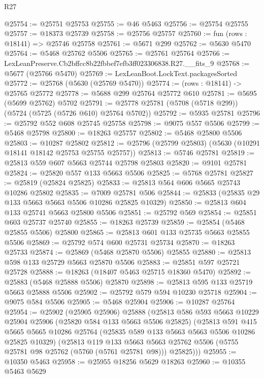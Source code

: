\begin{lexlean}{R27}
\begin{coremodule}
@25754 := @25751 @25753
@25755 := @46 @5463
@25756 := @25754 @25755
@25757 := @18373 @25739
@25758 := @25756 @25757
@25760 := fun (rows : @18141) => @25746 @25758
@25761 := @5671 @299
@25762 := @5630 @5470
@25764 := @5468 @25762 @5506
@25765 := @25761 @25764
@25766 := LexLeanPreserve.Cb2bffcc8b22fbbef7efb3ff023306838.R27.__fits_9
@25768 := @5677 (@25766 @5470)
@25769 := LexLeanBoot.LockText.packagesSorted
@25772 := @25768 (@5630 (@25769 @5470))
@25774 := (rows : @18141) -> @25765 @25772
@25778 := @5688 @299 @25764 @25772 @610
@25781 := @5695 (@5699 @25762) @5702
@25791 := @25778 @25781 (@5708 (@5718 @299)) (@5724 (@5725 (@5726 @610) @25764 @5702))
@25792 := @5935 @25781
@25796 := @25792 @552 @608 @25745 @25758
@25798 := @9075 @557 @5506
@25799 := @5468 @25798
@25800 := @18263 @25757
@25802 := @5468 @25800 @5506
@25803 := @10287 @25802
@25812 := @25796 (@25799 @25803) (@5630 (@10291 @18141 @18142 @25753 @25755 @25757))
@25813 := @5746 @25781
@25819 := @25813 @559 @607 @5663 @25744 @25798 @25803
@25820 := @9101 @25781
@25824 := @25820 @557 @133 @5663 @5506
@25825 := @5768 @25781
@25827 := @25819 (@25824 @25825)
@25833 := @25813 @564 @606 @5665 @25743 @10286 @25802
@25835 := @7009 @25781 @506
@25844 := @25833 (@25835 @29 @133 @5663 @5663 @5506 @10286 @25825 @10329)
@25850 := @25813 @604 @133 @25741 @5663 @25800 @5506
@25851 := @25792 @569
@25854 := @25851 @603 @25737 @25740
@25855 := @18263 @25739
@25859 := @25854 (@5468 @25855 @5506) @25800
@25865 := @25813 @601 @133 @25735 @5663 @25855 @5506
@25869 := @25792 @574 @600 @25731 @25734
@25870 := @18263 @25733
@25874 := @25869 (@5468 @25870 @5506) @25855
@25880 := @25813 @598 @133 @25729 @5663 @25870 @5506
@25883 := @25851 @597 @25721 @25728
@25888 := @18263 (@18407 @5463 @25715 @18360 @5470)
@25892 := @25883 (@5468 @25888 @5506) @25870
@25898 := @25813 @595 @133 @25719 @5663 @25888 @5506
@25902 := @25792 @579 @594 @10230 @25718
@25904 := @9075 @584 @5506
@25905 := @5468 @25904
@25906 := @10287 @25764
@25954 := @25902
    (@25905 @25906)
    @25888
    (@25813
      @586
      @593
      @5663
      @10229
      @25904
      @25906
      (@25820 @584 @133 @5663 @5506 @25825)
      (@25813
        @591
        @415
        @5665
        @5665
        @10286
        @25764
        (@25835 @589 @133 @5663 @5663 @5506 @10286 @25825 @10329)
        (@25813
          @119
          @133
          @5663
          @5663
          @25762
          @5506
          (@5755 @25781 @98 @25762 (@5760 (@5761 @25781 @98)))
          @25825)))
@25955 := @10350 @5463
@25958 := @25955 @18256 @5629 @18263
@25960 := @10355 @5463 @5629

\end{coremodule}
\end{lexlean}

